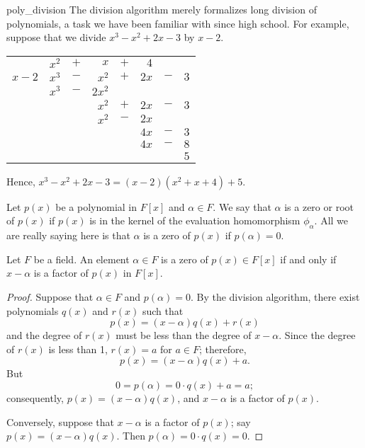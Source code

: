  
\begin{example}{poly_division}
The division algorithm merely formalizes long division of polynomials,
a task we have been familiar with since high school. For example,
suppose that we divide $x^3 - x^2 + 2 x - 3$ by $x - 2$.  
\begin{center}
\begin{tabular}{rrcrcrcr}
        &  $x^2$  &  $+$  &      $x$  &  $+$  &    $4$  &       &       \\ \cline{2-8}
 \multicolumn{1}{r|}{$x - 2$}
        &  $x^3$  &  $-$  &    $x^2$  &  $+$  &  $2 x$  &  $-$  &  $3$  \\
        &  $x^3$  &  $-$  &  $2 x^2$  &       &         &       &       \\ \cline{2-8}
        &         &       &    $x^2$  &  $+$  &  $2 x$  &  $-$  &  $3$  \\
        &         &       &    $x^2$  &  $-$  &  $2 x$  &       &       \\ \cline{4-8}
        &         &       &           &       &  $4 x$  &  $-$  &  $3$  \\
        &         &       &           &       &  $4 x$  &  $-$  &  $8$  \\ \cline{6-8}
        &         &       &           &       &         &       &  $5$
\end{tabular}
\end{center}
Hence, $x^3 - x^2 + 2 x - 3 = (x - 2) (x^2 + x + 4 ) + 5$.
\end{example}

 
 
Let $p(x)$ be a polynomial in $F[x]$ and $\alpha \in F$.  We say that
$\alpha$ is a {\bfi zero\/} or {\bfi root\/} of $p(x)$ if
$p(x)$ is in the kernel of the evaluation homomorphism
$\phi_{\alpha}$. All we are really saying here is that $\alpha$ is a
zero of $p(x)$ if $p(\alpha) = 0$.  
 
 
\begin{corollary}\label{poly:factor_corollary}
Let $F$ be a field.
An element $\alpha \in F$ is a zero of $p(x) \in F[x]$ if and only if
$x - \alpha$ is a factor of $p(x)$ in $F[x]$. 
\end{corollary}
 
 
\begin{proof}
Suppose that $\alpha \in F$ and $p( \alpha ) = 0$. By the division
algorithm, there exist polynomials $q(x)$ and $r(x)$ such that
\[
p(x) = (x -\alpha) q(x) + r(x)
\]
and the degree of $r(x)$ must be less than the degree of $x -\alpha$.
Since the degree of $r(x)$ is less than 1, $r(x) = a$ for $a \in F$;
therefore, 
\[
p(x) = (x -\alpha) q(x) + a.
\]
But 
\[
0 = p(\alpha) = 0 \cdot q(x) + a = a;
\]
consequently, $p(x) = (x - \alpha) q(x)$, and $x - \alpha$ is a factor 
of $p(x)$.
 
 
Conversely, suppose that $x - \alpha$ is a factor of $p(x)$; say $p(x)
= (x - \alpha) q(x)$. Then $p( \alpha ) = 0 \cdot q(x) = 0$. 
\end{proof}
 
